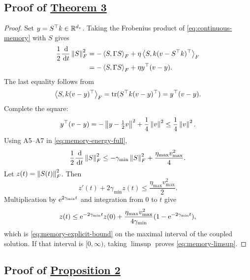 \subsection{Proof of \hyperref[thm:memory-boundedness]{Theorem 3}}
\label{app:memory-bound}

\begin{proof}
Set $y=S^\top k\in\mathbb{R}^{d_v}$. Taking the Frobenius product of
\eqref{eq:continuous-memory} with $S$ gives
\begin{align}
 \frac12\frac{\,\mathrm{d}}{\,\mathrm{d} t}\left\lVert S\right\rVert_F^2
 &=-\left\langle S,\Gamma S\right\rangle_F
 +\eta\left\langle S,k(v-S^\top k)^\top\right\rangle_F \notag\\
 &=-\left\langle S,\Gamma S\right\rangle_F
 +\eta y^\top(v-y).
 \label{eq:memory-energy-full}
\end{align}
The last equality follows from
\begin{equation}
 \left\langle S,k(v-y)^\top\right\rangle_F
 =\operatorname{tr}(S^\top k(v-y)^\top)
 =y^\top(v-y).
 \label{eq:frobenius-write}
\end{equation}
Complete the square:
\begin{equation}
 y^\top(v-y)
 =-\left\lVert y-\tfrac12v\right\rVert^2+\frac14\left\lVert v\right\rVert^2
 \le\frac14\left\lVert v\right\rVert^2.
 \label{eq:complete-square}
\end{equation}
Using A5--A7 in \eqref{eq:memory-energy-full},
\begin{equation}
 \frac12\frac{\,\mathrm{d}}{\,\mathrm{d} t}\left\lVert S\right\rVert_F^2
 \le
 -\gamma_{\min}\left\lVert S\right\rVert_F^2+
 \frac{\eta_{\max}v_{\max}^2}{4}.
 \label{eq:scalar-memory-inequality}
\end{equation}
Let $z(t)=\left\lVert S(t)\right\rVert_F^2$. Then
\begin{equation}
 z'(t)+2\gamma_{\min}z(t)
 \le\frac{\eta_{\max}v_{\max}^2}{2}.
 \label{eq:z-inequality}
\end{equation}
Multiplication by $\mathrm{e}^{2\gamma_{\min}t}$ and integration from $0$ to $t$
give
\begin{equation}
 z(t)\le
 \mathrm{e}^{-2\gamma_{\min}t}z(0)
 +\frac{\eta_{\max}v_{\max}^2}{4\gamma_{\min}}
 (1-\mathrm{e}^{-2\gamma_{\min}t}),
 \label{eq:z-bound-proof}
\end{equation}
which is \eqref{eq:memory-explicit-bound} on the maximal interval of the
coupled solution. If that interval is $[0,\infty)$, taking $\limsup$ proves
\eqref{eq:memory-limsup}.
\end{proof}

\subsection{Proof of \hyperref[prop:memory-passivity]{Proposition 2}}
\label{app:passivity}

